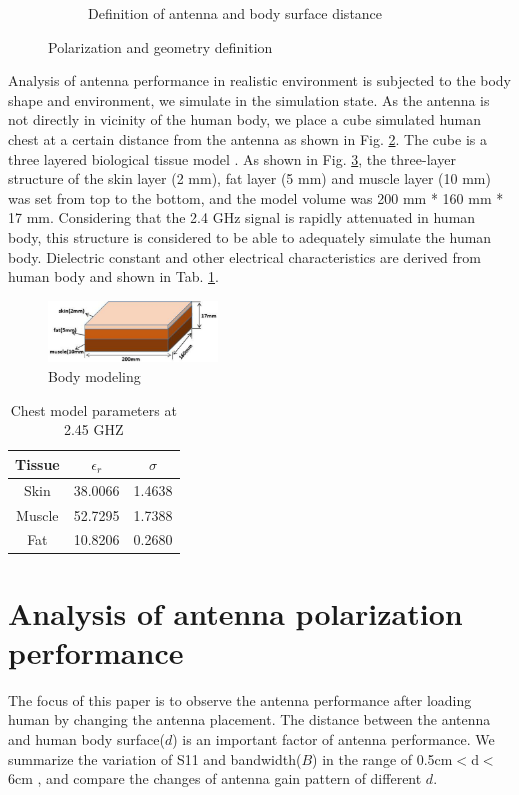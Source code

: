 \documentclass[journal]{IEEEtran}
\begin{document}
\begin{figure}[!htb]
\begin{subfigure}[b]{0.4\textwidth}
\caption{Definition of antenna and body surface distance}
\label{fig:3c}
\end{subfigure}
\caption{Polarization and geometry definition}
\label{fig:3}
\end{figure}
Analysis of antenna performance in realistic environment is subjected to the body shape and environment, we simulate in the
simulation state. As the antenna is not directly in vicinity of the human body, we place a cube simulated human chest at a
certain distance from the antenna as shown in Fig. \ref{fig:3}. The cube is a three layered biological tissue model \cite{17}
. As shown in Fig. \ref{fig:4}, the three-layer structure of the skin layer (2 mm), fat layer (5 mm) and muscle layer (10 mm)
was set from top to the bottom, and the model volume was 200 mm * 160 mm * 17 mm. Considering that the 2.4 GHz signal is
rapidly attenuated in human body, this structure is considered to be able to adequately simulate the human body. Dielectric
constant and other electrical characteristics \cite{17} are derived from human body and shown in Tab. \ref{tab:2}.
\begin{figure}[!htb]
\centering
\includegraphics[width=0.4\textwidth]{figs/4.eps}
\caption{Body modeling}
\label{fig:4}	
\end{figure}
\begin{table}[!htb]
\centering
\begin{tabular}{|c|c|c|}
\hline
Tissue&$\epsilon_{r}$&$\sigma$\\
\hline
Skin&38.0066&1.4638\\
\hline
Muscle&52.7295&1.7388\\
Fat&10.8206&0.2680\\
\hline
\end{tabular}
\caption{Chest model parameters at 2.45 GHZ}
\label{tab:2}
\end{table}
\section{Analysis of antenna polarization performance}
The focus of this paper is to observe the antenna performance after loading human by changing the antenna placement. The
distance between the antenna and human body surface($d$) is an important factor of antenna performance. We summarize
the variation of S11 and bandwidth($B$) in the range of 0.5cm$<$d$<$6cm , and compare the changes of antenna
gain pattern of different $d$.
\end{document}
